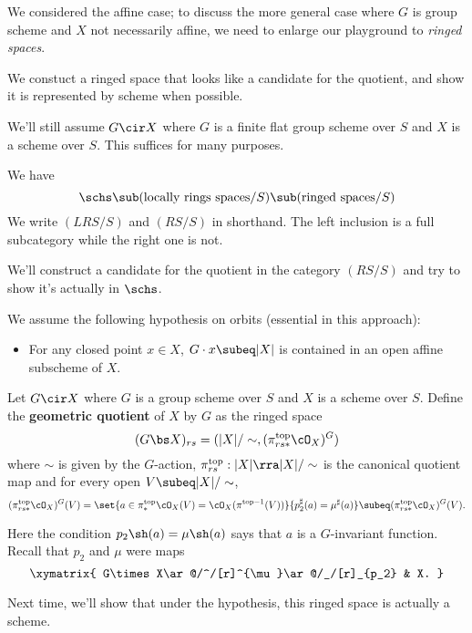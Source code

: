 We considered the affine case; to discuss the more general case where $G$ is group scheme and $X$ not necessarily affine, we need to enlarge our playground to {\it ringed spaces}.

We constuct a ringed space that looks like a candidate for the quotient, and show it is represented by scheme when possible.

We'll still assume $G\cir X$ where $G$ is a finite flat group scheme over $S$ and $X$ is a scheme over $S$. %
This suffices for many purposes.

We have 
\[\schs\sub (\text{locally rings spaces}/S)\sub (\text{ringed spaces}/S)\]
We write $(LRS/S)$ and $(RS/S)$ in shorthand. The left inclusion is a full subcategory while the right one is not. 

We'll construct a candidate for the quotient in the category $(RS/S)$ and try to show it's actually in $\schs$.

We assume the following hypothesis on orbits (essential in this approach):
\begin{itemize}
\item
For any closed point $x\in X$, $G\cdot x\subeq |X|$ is contained in an open affine subscheme of $X$.
\end{itemize}
\begin{df}
Let $G\cir X$ where $G$ is a group scheme over $S$ and $X$ is a scheme over $S$. Define the \textbf{geometric quotient} of $X$ by $G$ as the ringed space
\[
(G\bs X)_{rs} = (|X|/\sim, (\pi_{rs*}^{\text{top}}\cO_X)^G)
\]
where $\sim$ is given by the $G$-action, $\pi^{\text{top}}_{rs}:|X|\rra |X|/\sim$ is the canonical quotient map and for every open $V\subeq |X|/\sim$,
\[
(\pi_{rs*}^{\text{top}}\cO_X)^G(V)=\set{a\in \pi_*^{\text{top}}\cO_X(V)=\cO_X(\pi^{\text{top}-1}(V))}
{p_2^{\sharp}(a)=\mu^{\sharp}(a)}\subeq (\pi^{\text{top}}_{rs*}\cO_X)^G(V).
\]
\end{df}
Here the condition $p_2\sh(a)=\mu\sh(a)$ says that $a$ is a $G$-invariant function. Recall that $p_2$ and $\mu$ were maps
\[
\xymatrix{
G\times X\ar@/^/[r]^{\mu}\ar@/_/[r]_{p_2} & X.
}
\]

Next time, we'll show that under the hypothesis, this ringed space is actually a scheme.

